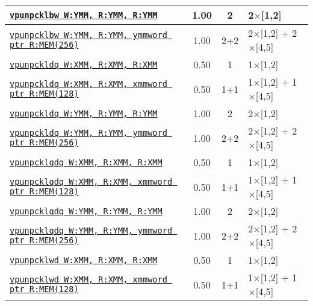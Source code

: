 \documentclass[a4paper,english,fontsize=9]{scrartcl}
\begin{document}
\begin{longtable}{p{}ccL{.25\textwidth}}
  \midrule
  \texttt{\href{https://felixcloutier.com/x86/PUNPCKLBW:PUNPCKLWD:PUNPCKLDQ:PUNPCKLQDQ.html}{vpunpcklbw W:YMM, R:YMM, R:YMM}} & 1.00 & 2 & 2\(\times\)[1,2] \\
  \midrule
  \texttt{\href{https://felixcloutier.com/x86/PUNPCKLBW:PUNPCKLWD:PUNPCKLDQ:PUNPCKLQDQ.html}{vpunpcklbw W:YMM, R:YMM, ymmword ptr R:MEM(256)}} & 1.00 & 2+2 & 2\(\times\)[1,2] + 2\(\times\)[4,5] \\
  \midrule
  \texttt{\href{https://felixcloutier.com/x86/PUNPCKLBW:PUNPCKLWD:PUNPCKLDQ:PUNPCKLQDQ.html}{vpunpckldq W:XMM, R:XMM, R:XMM}} & 0.50 & 1 & 1\(\times\)[1,2] \\
  \midrule
  \texttt{\href{https://felixcloutier.com/x86/PUNPCKLBW:PUNPCKLWD:PUNPCKLDQ:PUNPCKLQDQ.html}{vpunpckldq W:XMM, R:XMM, xmmword ptr R:MEM(128)}} & 0.50 & 1+1 & 1\(\times\)[1,2] + 1\(\times\)[4,5] \\
  \midrule
  \texttt{\href{https://felixcloutier.com/x86/PUNPCKLBW:PUNPCKLWD:PUNPCKLDQ:PUNPCKLQDQ.html}{vpunpckldq W:YMM, R:YMM, R:YMM}} & 1.00 & 2 & 2\(\times\)[1,2] \\
  \midrule
  \texttt{\href{https://felixcloutier.com/x86/PUNPCKLBW:PUNPCKLWD:PUNPCKLDQ:PUNPCKLQDQ.html}{vpunpckldq W:YMM, R:YMM, ymmword ptr R:MEM(256)}} & 1.00 & 2+2 & 2\(\times\)[1,2] + 2\(\times\)[4,5] \\
  \midrule
  \texttt{\href{https://felixcloutier.com/x86/PUNPCKLBW:PUNPCKLWD:PUNPCKLDQ:PUNPCKLQDQ.html}{vpunpcklqdq W:XMM, R:XMM, R:XMM}} & 0.50 & 1 & 1\(\times\)[1,2] \\
  \midrule
  \texttt{\href{https://felixcloutier.com/x86/PUNPCKLBW:PUNPCKLWD:PUNPCKLDQ:PUNPCKLQDQ.html}{vpunpcklqdq W:XMM, R:XMM, xmmword ptr R:MEM(128)}} & 0.50 & 1+1 & 1\(\times\)[1,2] + 1\(\times\)[4,5] \\
  \midrule
  \texttt{\href{https://felixcloutier.com/x86/PUNPCKLBW:PUNPCKLWD:PUNPCKLDQ:PUNPCKLQDQ.html}{vpunpcklqdq W:YMM, R:YMM, R:YMM}} & 1.00 & 2 & 2\(\times\)[1,2] \\
  \midrule
  \texttt{\href{https://felixcloutier.com/x86/PUNPCKLBW:PUNPCKLWD:PUNPCKLDQ:PUNPCKLQDQ.html}{vpunpcklqdq W:YMM, R:YMM, ymmword ptr R:MEM(256)}} & 1.00 & 2+2 & 2\(\times\)[1,2] + 2\(\times\)[4,5] \\
  \midrule
  \texttt{\href{https://felixcloutier.com/x86/PUNPCKLBW:PUNPCKLWD:PUNPCKLDQ:PUNPCKLQDQ.html}{vpunpcklwd W:XMM, R:XMM, R:XMM}} & 0.50 & 1 & 1\(\times\)[1,2] \\
  \midrule
  \texttt{\href{https://felixcloutier.com/x86/PUNPCKLBW:PUNPCKLWD:PUNPCKLDQ:PUNPCKLQDQ.html}{vpunpcklwd W:XMM, R:XMM, xmmword ptr R:MEM(128)}} & 0.50 & 1+1 & 1\(\times\)[1,2] + 1\(\times\)[4,5] \\

\end{longtable}
\end{document}
